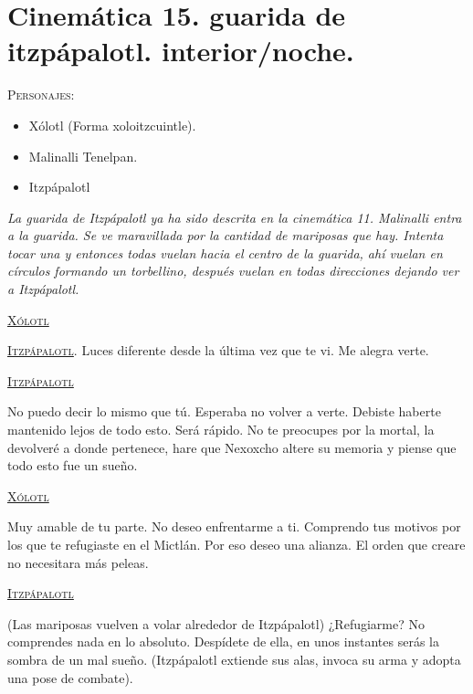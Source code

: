 \documentclass[11pt,letterpaper]{article}
\begin{document}
\section{Cinemática 15. guarida de itzpápalotl. interior/noche.}
 \textsc{Personajes}:
 \begin{itemize}
 \item Xólotl (Forma xoloitzcuintle).
 \item Malinalli Tenelpan.
 \item Itzpápalotl
 \end{itemize}
 \textit{La guarida de Itzpápalotl ya ha sido descrita en la cinemática 11. Malinalli entra a la guarida. Se ve maravillada por la cantidad de mariposas que hay. Intenta tocar una y entonces todas vuelan hacia el centro de la guarida, ahí vuelan en círculos formando un torbellino, después vuelan en todas direcciones dejando ver a Itzpápalotl.}
 \begin{center}
 \textsc{\underline{Xólotl}}
 \\
\par
\textsc{\underline{Itzpápalotl}}. Luces diferente desde la última vez que te vi. Me alegra verte.
\\
\par
\textsc{\underline{Itzpápalotl}}
\\
\par
No puedo decir lo mismo que tú. Esperaba no volver a verte. Debiste haberte mantenido lejos de todo esto. Será rápido. No te preocupes por la mortal, la devolveré a donde pertenece, hare que Nexoxcho altere su memoria y piense que todo esto fue un sueño.
\\
\par
\textsc{\underline{Xólotl}}
\\
\par
Muy amable de tu parte. No deseo enfrentarme a ti. Comprendo tus motivos por los que te refugiaste en el Mictlán. Por eso deseo una alianza. El orden que creare no necesitara más peleas.
\\
\par
\textsc{\underline{Itzpápalotl}}
\\
\par
(Las mariposas vuelven a volar alrededor de Itzpápalotl) ¿Refugiarme? No comprendes nada en lo absoluto. Despídete de ella, en unos instantes serás la sombra de un mal sueño.  (Itzpápalotl extiende sus alas, invoca su arma y adopta una pose de combate).
 \end{center}
 
\end{document}
